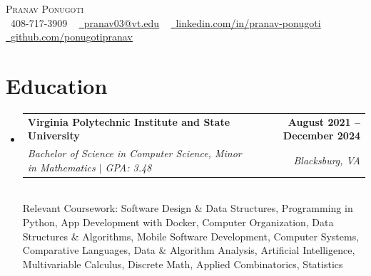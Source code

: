 \documentclass[letterpaper,11pt]{article}
\makeatletter
\newcommand{\resumeSubheading}[4]{
  \vspace{-2pt}\item
    \begin{tabular*}{1.0\textwidth}[t]{l@{\extracolsep{\fill}}r}
      \textbf{#1} & \textbf{\small #2} \\
      \textit{\small#3} & \textit{\small #4} \\
    \end{tabular*}\vspace{-7pt}
}
\newcommand{\resumeSubHeadingListStart}{\begin{itemize}[leftmargin=0.0in, label={}]}
\newcommand{\resumeSubHeadingListEnd}{\end{itemize}}
\makeatother
\begin{document}
\begin{center}
    {\Huge \scshape Pranav Ponugoti} \\ \vspace{1pt}
    \small \raisebox{-0.1\height}\faPhone\ 408-717-3909 ~ \href{mailto:pranav03@vt.edu}{\raisebox{-0.2\height}\faEnvelope\  \underline{pranav03@vt.edu}} ~ 
    \href{https://linkedin.com/in/pranav-ponugoti/}{\raisebox{-0.2\height}\faLinkedin\ \underline{linkedin.com/in/pranav-ponugoti}}  ~
    \href{https://github.com/ponugotipranav}{\raisebox{-0.2\height}\faGithub\ \underline{github.com/ponugotipranav}}
    \vspace{-2pt}
\end{center}


\section{Education}
  \resumeSubHeadingListStart
    \resumeSubheading
      {Virginia Polytechnic Institute and State University}{August 2021 -- December 2024}
      {Bachelor of Science in Computer Science, Minor in Mathematics \normalfont $|$ GPA: 3.48}{Blacksburg, VA}\\
      \vspace{9pt}
      {\small Relevant Coursework: Software Design \& Data Structures, Programming in Python, App Development with Docker, Computer Organization, Data Structures \& Algorithms, Mobile Software Development, Computer Systems, Comparative Languages, Data \& Algorithm Analysis, Artificial Intelligence, Multivariable Calculus, Discrete Math, Applied Combinatorics, Statistics}
  \resumeSubHeadingListEnd
\vspace{-14pt}
\end{document}
